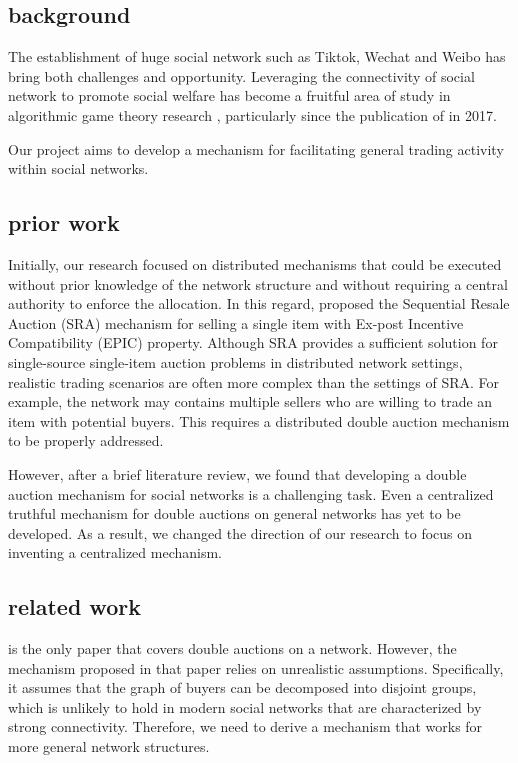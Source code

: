 \subsection{background}

The establishment of huge social network such as Tiktok, Wechat and Weibo has bring both challenges and opportunity.
Leveraging the connectivity of social network to promote social welfare has become a fruitful area of study in algorithmic game theory research , particularly since the publication of \cite{mechanism-design-in-social-network} in 2017.

Our project aims to develop a mechanism for facilitating general trading activity within social networks.

\subsection{prior work}

Initially, our research focused on distributed mechanisms that could be executed without prior knowledge of the network structure and without requiring a central authority to enforce the allocation.
In this regard, \cite{SRA} proposed the Sequential Resale Auction (SRA) mechanism for selling a single item with Ex-post Incentive Compatibility (EPIC) property.
Although SRA provides a sufficient solution for single-source single-item auction problems in distributed network settings,
realistic trading scenarios are often more complex than the settings of SRA.
For example, the network may contains multiple sellers who are willing to trade an item with potential buyers.
This requires a distributed double auction mechanism to be properly addressed.

However, after a brief literature review, we found that developing a double auction mechanism for social networks is a challenging task.
Even a centralized truthful mechanism for double auctions on general networks has yet to be developed.
As a result, we changed the direction of our research to focus on inventing a centralized mechanism.

\subsection{related work}

\cite{DNA} is the only paper that covers double auctions on a network. However, the mechanism proposed in that paper relies on unrealistic assumptions.
Specifically, it assumes that the graph of buyers can be decomposed into disjoint groups, which is unlikely to hold in modern social networks that are characterized by strong connectivity.
Therefore, we need to derive a mechanism that works for more general network structures.


